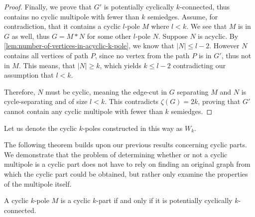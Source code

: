 \documentclass[12pt, twoside]{book}
\begin{document}
\begin{proof}
	Finally, we prove that $G'$ is potentially cyclically $k$-connected, thus contains no cyclic multipole with fewer than $k$ semiedges. Assume, for contradiction, that it contains a cyclic $l$-pole $M$ where $l<k$. We see that $M$ is in $G$ as well, thus $G=M*N$ for some other $l$-pole $N$. Suppose $N$ is acyclic. By \cref{lem:number-of-vertices-in-acyclic-k-pole}, we know that $|N|\leq l-2$. However $N$ contains all vertices of path $P$, since no vertex from the path $P$ is in $G'$, thus not in $M$. This means, that $|N|\geq k$, which yields $k\leq l-2$ contradicting our assumption that $l<k$.
	
	Therefore, $N$ must be cyclic, meaning the edge-cut in $G$ separating $M$ and $N$ is cycle-separating and of size $l<k$. This contradicts $\zeta(G)=2k$, proving that $G'$ cannot contain any cyclic multipole with fewer than $k$ semiedges.
\end{proof}

Let us denote the cyclic $k$-poles constructed in this way as $W_k$.

The following theorem builds upon our previous results concerning cyclic parts. We demonstrate that the problem of determining whether or not a cyclic multipole is a cyclic part does not have to rely on finding an original graph from which the cyclic part could be obtained, but rather only examine the properties of the multipole itself.

\begin{theorem}\label{th:alternative-definition-of-cyclic-part}
	A cyclic $k$-pole $M$ is a cyclic $k$-part if and only if it is potentially cyclically $k$-connected.
\end{theorem}
\end{document}
